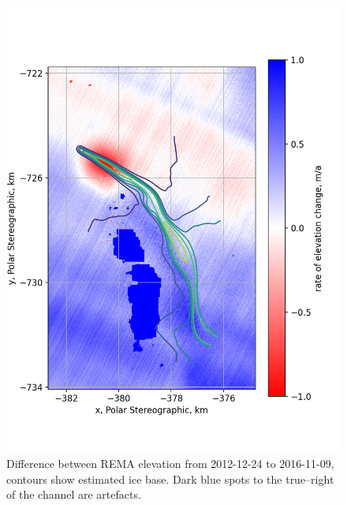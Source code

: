 \begin{figure}[!ht]
\includegraphics[width=1\textwidth]{chapters/2/REMAdiff_alone.png}
\caption[REMA difference map]{Difference between REMA elevation from 2012-12-24 to 2016-11-09, contours show estimated ice base. Dark blue spots to the true--right of the channel are artefacts.}
\label{fig:REMAdiff_alone.png}
\end{figure}



